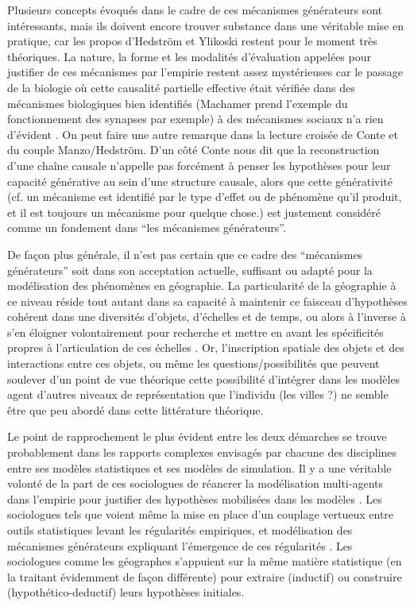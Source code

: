 Plusieurs concepts évoqués dans le cadre de ces mécanismes générateurs sont intéressants, mais ils doivent encore trouver substance dans une véritable mise en pratique, car les propos d'Hedström et Ylikoski restent pour le moment très théoriques. La nature, la forme et les modalités d'évaluation appelées pour justifier de ces mécanismes par l'empirie restent assez mystérieuses car le passage de la biologie où cette causalité partielle effective était vérifiée dans des mécanismes biologiques bien identifiés (Machamer prend l'exemple du fonctionnement des synapses par exemple) à des mécanismes sociaux n'a rien d'évident \autocite{Varenne2014b}. On peut faire une autre remarque dans la lecture croisée de Conte et du couple Manzo/Hedström. D'un côté Conte nous dit que la reconstruction d'une chaîne causale n'appelle pas forcément à penser les hypothèses pour leur capacité générative au sein d'une structure causale, alors que cette générativité (cf. un mécanisme est identifié par le type d'effet ou de phénomène qu'il produit, et il est toujours un mécanisme pour quelque chose.) est justement considéré comme un fondement dans \enquote{les mécanismes générateurs}.

De façon plus générale, il n'est pas certain que ce cadre des \enquote{mécanismes générateurs} soit dans son acceptation actuelle, suffisant ou adapté pour la modélisation des phénomènes en géographie. La particularité de la géographie à ce niveau réside tout autant dans sa capacité à maintenir ce faisceau d'hypothèses cohérent dans une diversités d'objets, d'échelles et de temps, ou alors à l'inverse à s'en éloigner volontairement pour recherche et mettre en avant les spécificités propres à l'articulation de ces échelles \autocite{Sanders2001}. Or, l'inscription spatiale des objets et des interactions entre ces objets, ou même les questions/possibilités que peuvent soulever d'un point de vue théorique cette possibilité d'intégrer dans les modèles agent d'autres niveaux de représentation que l'individu (les villes \autocite{Sanders2006} ?) ne semble être que peu abordé dans cette littérature théorique.
 
Le point de rapprochement le plus évident entre les deux démarches se trouve probablement dans les rapports complexes envisagés par chacune des disciplines entre ses modèles statistiques et ses modèles de simulation. Il y a une véritable volonté de la part de ces sociologues de réancrer  la modélisation multi-agents dans l'empirie pour justifier des hypothèses mobilisées dans les modèles \autocites{Manzo2005}[23]{Manzo2007}{Hedstrom2015}. Les sociologues tels que \textcite{Goldthorpe2001} voient même la mise en place d'un couplage vertueux entre outils statistiques levant les régularités empiriques, et modélisation des mécanismes générateurs expliquant l'émergence de ces régularités \autocite[50]{Manzo2005}. Les sociologues comme les géographes s'appuient sur la même matière statistique (en la traitant évidemment de façon différente) pour extraire (inductif) ou construire (hypothético-deductif) leurs hypothèses initiales. 

